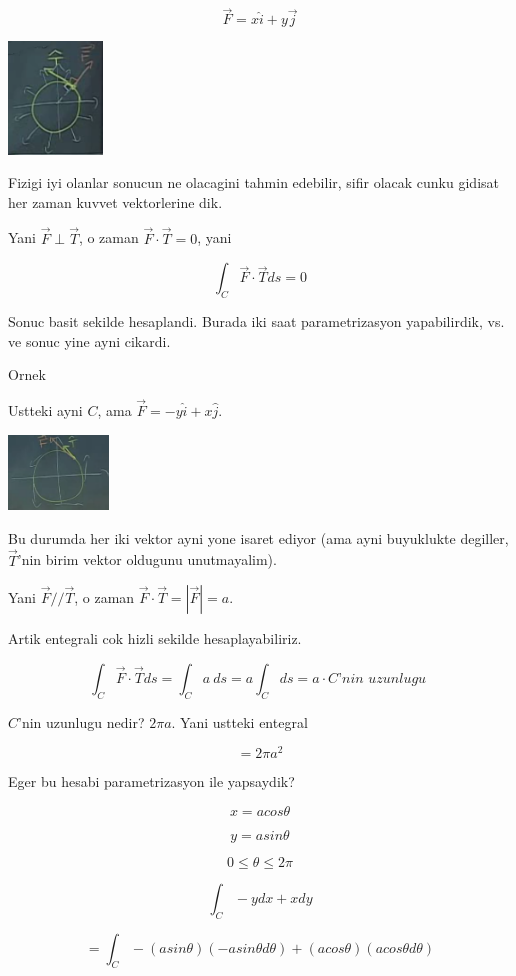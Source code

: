 \documentclass[12pt,fleqn]{article}
\begin{document}
\[ \vec{F} = x\hat{i} + y\vec{j} \]

\includegraphics[height=3cm]{19_13.png}

Fizigi iyi olanlar sonucun ne olacagini tahmin edebilir, sifir olacak cunku
gidisat her zaman kuvvet vektorlerine dik. 

Yani $\vec{F} \perp \vec{T}$, o zaman $\vec{F} \cdot \vec{T} = 0$, yani

\[  \int_C \vec{F} \cdot \vec{T} ds = 0\]

Sonuc basit sekilde hesaplandi. Burada iki saat parametrizasyon
yapabilirdik, vs. ve sonuc yine ayni cikardi. 

Ornek

Ustteki ayni $C$, ama $\vec{F} = -y\hat{i} + x\hat{j}$. 

\includegraphics[height=2cm]{19_14.png}

Bu durumda her iki vektor ayni yone isaret ediyor (ama ayni buyuklukte
degiller, $\vec{T}$'nin birim vektor oldugunu unutmayalim). 

Yani $\vec{F} // \vec{T}$, o zaman $\vec{F} \cdot \vec{T} = |\vec{F}| =
a$.

Artik entegrali cok hizli sekilde hesaplayabiliriz. 

\[  \int_C \vec{F} \cdot \vec{T} ds 
=  \int_C a \ ds 
= a  \int_C ds 
= a \cdot C \textit{'nin uzunlugu }
\]

$C$'nin uzunlugu nedir? $2\pi a$. Yani ustteki entegral

\[ = 2\pi a^2 \]

Eger bu hesabi parametrizasyon ile yapsaydik? 

\[ x = acos\theta \]

\[ y = asin\theta \]

\[ 0 \le \theta \le 2\pi \]

\[ \int_C -y dx + x dy \]


\[ = \int_C -(asin\theta)(-asin\theta d\theta) + 
(acos\theta)(a cos\theta d\theta)
\]
\end{document}
